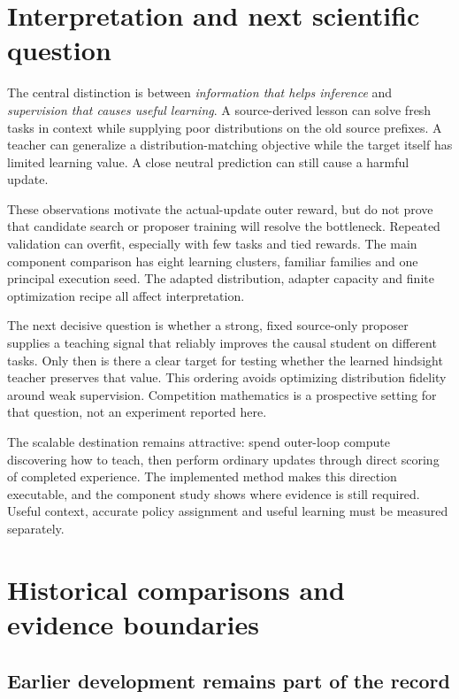 \documentclass[11pt,letterpaper]{article}
\begin{document}
\section{Interpretation and next scientific question}

The central distinction is between \emph{information that helps inference} and \emph{supervision that causes useful learning}. A source-derived lesson can solve fresh tasks in context while supplying poor distributions on the old source prefixes. A teacher can generalize a distribution-matching objective while the target itself has limited learning value. A close neutral prediction can still cause a harmful update.

These observations motivate the actual-update outer reward, but do not prove that candidate search or proposer training will resolve the bottleneck. Repeated validation can overfit, especially with few tasks and tied rewards. The main component comparison has eight learning clusters, familiar families and one principal execution seed. The adapted distribution, adapter capacity and finite optimization recipe all affect interpretation.

The next decisive question is whether a strong, fixed source-only proposer supplies a teaching signal that reliably improves the causal student on different tasks. Only then is there a clear target for testing whether the learned hindsight teacher preserves that value. This ordering avoids optimizing distribution fidelity around weak supervision. Competition mathematics is a prospective setting for that question, not an experiment reported here.

The scalable destination remains attractive: spend outer-loop compute discovering how to teach, then perform ordinary updates through direct scoring of completed experience. The implemented method makes this direction executable, and the component study shows where evidence is still required. Useful context, accurate policy assignment and useful learning must be measured separately.

\appendix
\section{Historical comparisons and evidence boundaries}
\label{app:evidence}

\subsection{Earlier development remains part of the record}
\end{document}
